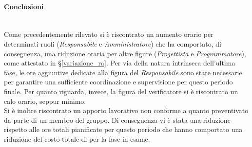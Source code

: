 \paragraph{Conclusioni} ~\\
Come precedentemente rilevato si è riscontrato un aumento orario per determinati ruoli (\textit{Responsabile} e \textit{Amministratore}) che ha comportato, di conseguenza, una riduzione oraria per altre figure (\textit{Progettista} e \textit{Programmatore}), come attestato in §\ref{variazione_ra}. Per via della natura intrinseca dell'ultima fase, le ore aggiuntive dedicate alla figura del \textit{Responsabile} sono state necessarie per garantire una sufficiente coordinazione e supervisione per questo periodo finale. Per quanto riguarda, invece, la figura del verificatore si è riscontrato un calo orario, seppur minimo.\\
Si è inoltre riscontrato un apporto lavorativo non conforme a quanto preventivato da parte di un membro del gruppo. Di conseguenza vi è stata una riduzione rispetto alle ore totali pianificate per questo periodo che hanno comportato una riduzione del costo totale di  per la fase in esame.
